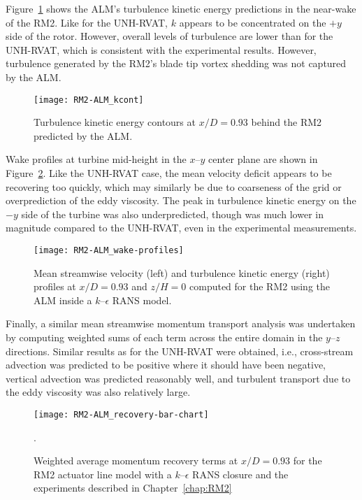 Figure~\ref{fig:RM2-ALM-kcont} shows the ALM's turbulence kinetic energy
predictions in the near-wake of the RM2. Like for the UNH-RVAT, $k$ appears to
be concentrated on the $+y$ side of the rotor. However, overall levels of
turbulence are lower than for the UNH-RVAT, which is consistent with the
experimental results. However, turbulence generated by the RM2's blade tip
vortex shedding was not captured by the ALM.

\begin{figure}
    \centering

    \texttt{[image: RM2-ALM\_kcont]}

    \caption{Turbulence kinetic energy contours at $x/D=0.93$ behind the RM2
        predicted by the ALM.}

    \label{fig:RM2-ALM-kcont}
\end{figure}

Wake profiles at turbine mid-height in the $x$--$y$ center plane are shown in
Figure~\ref{fig:RM2-ALM-profiles}. Like the UNH-RVAT case, the mean velocity
deficit appears to be recovering too quickly, which may similarly be due to
coarseness of the grid or overprediction of the eddy viscosity. The peak in
turbulence kinetic energy on the $-y$ side of the turbine was also
underpredicted, though was much lower in magnitude compared to the UNH-RVAT,
even in the experimental measurements.

\begin{figure}
    \centering

    \texttt{[image: RM2-ALM\_wake-profiles]}

    \caption{Mean streamwise velocity (left) and turbulence kinetic energy
    (right) profiles at $x/D=0.93$ and $z/H=0$ computed for the RM2 using the
    ALM inside a $k$--$\epsilon$ RANS model.}

    \label{fig:RM2-ALM-profiles}
\end{figure}

Finally, a similar mean streamwise momentum transport analysis was undertaken by
computing weighted sums of each term across the entire domain in the $y$--$z$
directions. Similar results as for the UNH-RVAT were obtained, i.e.,
cross-stream advection was predicted to be positive where it should have been
negative, vertical advection was predicted reasonably well, and turbulent
transport due to the eddy viscosity was also relatively large.

\begin{figure}
    \centering

    \texttt{[image: RM2-ALM\_recovery-bar-chart]}

    \caption{Weighted average momentum recovery terms at $x/D=0.93$ for the RM2
        actuator line model with a $k$--$\epsilon$ RANS closure and the experiments
        described in Chapter~\ref{chap:RM2}}.

    \label{fig:RM2-ALM-recovery}
\end{figure}


